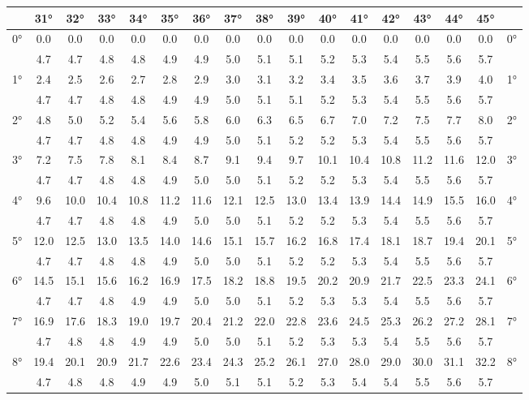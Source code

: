 \begin{scriptsize}\begin{tabular}{c || c | c | c | c | c | c | c | c | c | c | c | c | c | c | c || c}
		\space &31°&32°&33°&34°&35°&36°&37°&38°&39°&40°&41°&42°&43°&44°&45°\\\hline\hline
		\multirow{2}{*}{0°}&0.0&0.0&0.0&0.0&0.0&0.0&0.0&0.0&0.0&0.0&0.0&0.0&0.0&0.0&0.0&\multirow{2}{*}{0°}\\ \space&4.7&4.7&4.8&4.8&4.9&4.9&5.0&5.1&5.1&5.2&5.3&5.4&5.5&5.6&5.7&\space\\\hline
		\multirow{2}{*}{1°}&2.4&2.5&2.6&2.7&2.8&2.9&3.0&3.1&3.2&3.4&3.5&3.6&3.7&3.9&4.0&\multirow{2}{*}{1°}\\ \space&4.7&4.7&4.8&4.8&4.9&4.9&5.0&5.1&5.1&5.2&5.3&5.4&5.5&5.6&5.7&\space\\\hline
		\multirow{2}{*}{2°}&4.8&5.0&5.2&5.4&5.6&5.8&6.0&6.3&6.5&6.7&7.0&7.2&7.5&7.7&8.0&\multirow{2}{*}{2°}\\ \space&4.7&4.7&4.8&4.8&4.9&4.9&5.0&5.1&5.2&5.2&5.3&5.4&5.5&5.6&5.7&\space\\\hline
		\multirow{2}{*}{3°}&7.2&7.5&7.8&8.1&8.4&8.7&9.1&9.4&9.7&10.1&10.4&10.8&11.2&11.6&12.0&\multirow{2}{*}{3°}\\ \space&4.7&4.7&4.8&4.8&4.9&5.0&5.0&5.1&5.2&5.2&5.3&5.4&5.5&5.6&5.7&\space\\\hline
		\multirow{2}{*}{4°}&9.6&10.0&10.4&10.8&11.2&11.6&12.1&12.5&13.0&13.4&13.9&14.4&14.9&15.5&16.0&\multirow{2}{*}{4°}\\ \space&4.7&4.7&4.8&4.8&4.9&5.0&5.0&5.1&5.2&5.2&5.3&5.4&5.5&5.6&5.7&\space\\\hline
		\multirow{2}{*}{5°}&12.0&12.5&13.0&13.5&14.0&14.6&15.1&15.7&16.2&16.8&17.4&18.1&18.7&19.4&20.1&\multirow{2}{*}{5°}\\ \space&4.7&4.7&4.8&4.8&4.9&5.0&5.0&5.1&5.2&5.2&5.3&5.4&5.5&5.6&5.7&\space\\\hline
		\multirow{2}{*}{6°}&14.5&15.1&15.6&16.2&16.9&17.5&18.2&18.8&19.5&20.2&20.9&21.7&22.5&23.3&24.1&\multirow{2}{*}{6°}\\ \space&4.7&4.7&4.8&4.9&4.9&5.0&5.0&5.1&5.2&5.3&5.3&5.4&5.5&5.6&5.7&\space\\\hline
		\multirow{2}{*}{7°}&16.9&17.6&18.3&19.0&19.7&20.4&21.2&22.0&22.8&23.6&24.5&25.3&26.2&27.2&28.1&\multirow{2}{*}{7°}\\ \space&4.7&4.8&4.8&4.9&4.9&5.0&5.0&5.1&5.2&5.3&5.3&5.4&5.5&5.6&5.7&\space\\\hline
		\multirow{2}{*}{8°}&19.4&20.1&20.9&21.7&22.6&23.4&24.3&25.2&26.1&27.0&28.0&29.0&30.0&31.1&32.2&\multirow{2}{*}{8°}\\ \space&4.7&4.8&4.8&4.9&4.9&5.0&5.1&5.1&5.2&5.3&5.4&5.4&5.5&5.6&5.7&\space\\\hline

\end{tabular}
\end{scriptsize}
